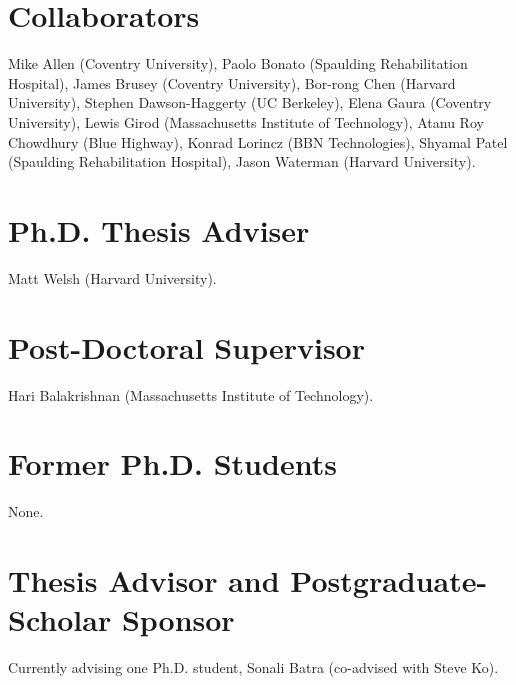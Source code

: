 \section{Collaborators}

Mike Allen (Coventry University), Paolo Bonato (Spaulding Rehabilitation
Hospital), James Brusey (Coventry University), Bor-rong Chen (Harvard
University), Stephen Dawson-Haggerty (UC Berkeley), Elena Gaura (Coventry
University), Lewis Girod (Massachusetts Institute of Technology), Atanu Roy
Chowdhury (Blue Highway), Konrad Lorincz (BBN Technologies), Shyamal Patel
(Spaulding Rehabilitation Hospital), Jason Waterman (Harvard University).

\section{Ph.D. Thesis Adviser}

Matt Welsh (Harvard University).

\section{Post-Doctoral Supervisor}

Hari Balakrishnan (Massachusetts Institute of Technology).

\section{Former Ph.D. Students}

None.

\section{Thesis Advisor and Postgraduate-Scholar Sponsor}

Currently advising one Ph.D. student, Sonali Batra (co-advised with Steve
Ko).


